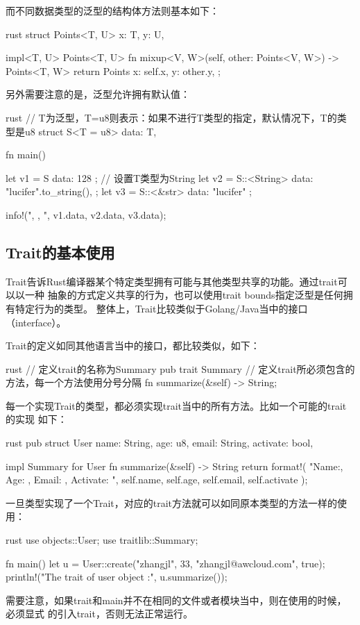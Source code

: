 而不同数据类型的泛型的结构体方法则基本如下：
\begin{code-block}{rust}
struct Points<T, U> {
    x: T,
    y: U,
}

impl<T, U> Points<T, U> {
    fn mixup<V, W>(self, other: Points<V, W>) -> Points<T, W> {
        return Points {
            x: self.x,
            y: other.y,
        };
    }
}
\end{code-block}

另外需要注意的是，泛型允许拥有默认值：
\begin{code-block}{rust}
// T为泛型，T=u8则表示：如果不进行T类型的指定，默认情况下，T的类型是u8
struct S<T = u8> {
    data: T,
}

fn main() {
    let v1 = S { data: 128 };
    // 设置T类型为String
    let v2 = S::<String> {
        data: "lucifer".to_string(),
    };
    let v3 = S::<&str> { data: "lucifer" };

    info!("{}, {}, {}", v1.data, v2.data, v3.data);
}
\end{code-block}

\subsection{Trait的基本使用}
Trait告诉Rust编译器某个特定类型拥有可能与其他类型共享的功能。通过trait可以以一种
抽象的方式定义共享的行为，也可以使用trait bounds指定泛型是任何拥有特定行为的类型。
整体上，Trait比较类似于Golang/Java当中的接口（interface）。

Trait的定义如同其他语言当中的接口，都比较类似，如下：
\begin{code-block}{rust}
// 定义trait的名称为Summary
pub trait Summary {
    // 定义trait所必须包含的方法，每一个方法使用分号分隔
    fn summarize(&self) -> String;
}
\end{code-block}

每一个实现Trait的类型，都必须实现trait当中的所有方法。比如一个可能的trait的实现
如下：
\begin{code-block}{rust}
pub struct User {
    name: String,
    age: u8,
    email: String,
    activate: bool,
}

impl Summary for User {
    fn summarize(&self) -> String {
        return format!(
            "Name:{}, Age: {}, Email: {}, Activate: {}",
            self.name, self.age, self.email, self.activate
        );
    }
}
\end{code-block}

一旦类型实现了一个Trait，对应的trait方法就可以如同原本类型的方法一样的使用：
\begin{code-block}{rust}
use objects::User;
use traitlib::Summary;

fn main() {
    let u = User::create("zhangjl", 33, "zhangjl@awcloud.com", true);
    println!("The trait of user object :{}", u.summarize());
}
\end{code-block}
需要注意，如果trait和main并不在相同的文件或者模块当中，则在使用的时候，必须显式
的引入trait，否则无法正常运行。

